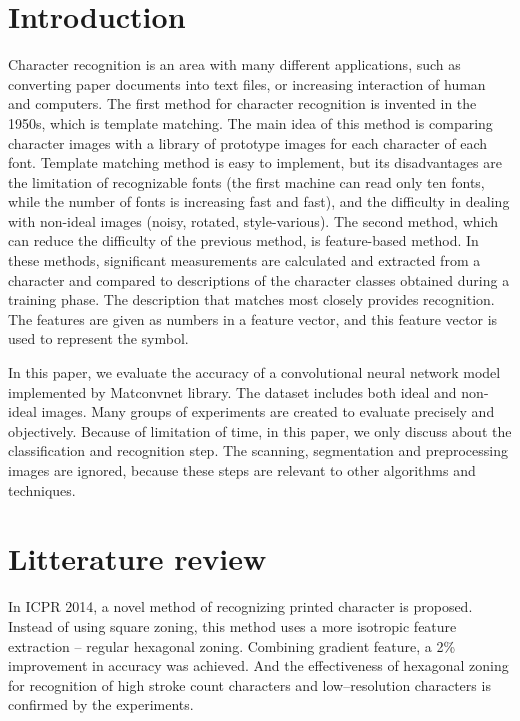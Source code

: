 \documentclass[10pt,twocolumn,letterpaper]{article}
\begin{document}
\section{Introduction}
Character recognition is an area with many different applications, such as converting paper documents into text files, or increasing interaction of human and computers. The first method for character recognition is invented in the 1950s, which is template matching. The main idea of this method is comparing character images with a library of prototype images for each character of each font. Template matching method is easy to implement, but its disadvantages are the limitation of recognizable fonts (the first machine can read only ten fonts, while the number of fonts is increasing fast and fast), and the difficulty in dealing with non-ideal images (noisy, rotated, style-various).  The second method, which can reduce the difficulty of the previous method, is feature-based method. In these methods, significant measurements are calculated and extracted from a character and compared to descriptions of the character classes obtained during a training phase. The description that matches most closely provides recognition. The features are given as numbers in a feature vector, and this feature vector is used to represent the symbol. 

In this paper, we evaluate the accuracy of a convolutional neural network model implemented by Matconvnet library. The dataset includes both ideal and non-ideal images. Many groups of experiments are created to evaluate precisely and objectively. Because of limitation of time, in this paper, we only discuss about the classification and recognition step. The scanning, segmentation and preprocessing images are ignored, because these steps are relevant to other algorithms and techniques. 
\section{Litterature review}
In ICPR 2014, a novel method of recognizing printed character is proposed. Instead of using square zoning, this method uses a more isotropic feature extraction – regular hexagonal zoning. Combining gradient feature, a 2\% improvement in accuracy was achieved. And the effectiveness of hexagonal zoning for recognition of high stroke count characters and low–resolution characters is confirmed by the experiments.
\end{document}
